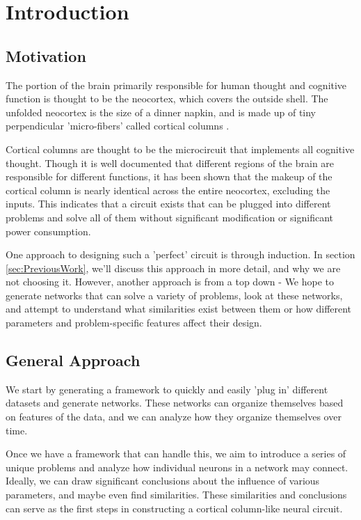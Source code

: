 \section{Introduction} \label{sec:Introduction}

\subsection{Motivation}

The portion of the brain primarily responsible for human thought and cognitive
function is thought to be the neocortex, which covers the outside shell. The
unfolded neocortex is the size of a dinner napkin, and is made up of tiny
perpendicular 'micro-fibers' called cortical columns \cite{Mountcastle}.

Cortical columns are thought to be the microcircuit that implements all
cognitive thought. Though it is well documented that different regions of the
brain are responsible for different functions, it has been shown \cite{Hawkins}
that the makeup of the cortical column is nearly identical across the entire
neocortex, excluding the inputs. This indicates that a circuit exists that can
be plugged into different problems and solve all of them without significant
modification or significant power consumption.

One approach to designing such a 'perfect' circuit is through induction. In
section \ref{sec:PreviousWork}, we'll discuss this approach in more detail, and
why we are not choosing it. However, another approach is from a top down - We
hope to generate networks that can solve a variety of problems, look at these
networks, and attempt to understand what similarities exist between them or how
different parameters and problem-specific features affect their design.

\subsection{General Approach}

We start by generating a framework to quickly and easily 'plug in' different
datasets and generate networks. These networks can organize themselves based on
features of the data, and we can analyze how they organize themselves over time.

Once we have a framework that can handle this, we aim to introduce a series of
unique problems and analyze how individual neurons in a network may connect.
Ideally, we can draw significant conclusions about the influence of various
parameters, and maybe even find similarities. These similarities and conclusions
can serve as the first steps in constructing a cortical column-like neural
circuit.

